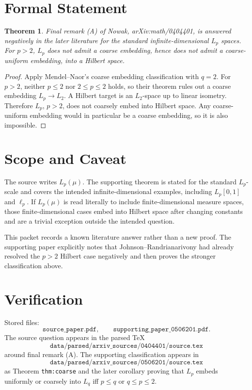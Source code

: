 \documentclass[11pt]{article}
\newtheorem*{theorem}{Theorem}
\begin{document}
\section*{Formal Statement}

\begin{theorem}
Final remark (A) of Nowak, arXiv:math/0404401, is answered negatively in the
later literature for the standard infinite-dimensional \(L_p\) spaces. For
\(p>2\), \(L_p\) does not admit a coarse embedding, hence does not admit a
coarse-uniform embedding, into a Hilbert space.
\end{theorem}

\begin{proof}
Apply Mendel--Naor's coarse embedding classification with \(q=2\). For
\(p>2\), neither \(p\le 2\) nor \(2\le p\le 2\) holds, so their theorem rules
out a coarse embedding \(L_p\to L_2\). A Hilbert target is an \(L_2\)-space up
to linear isometry. Therefore \(L_p\), \(p>2\), does not coarsely embed into
Hilbert space. Any coarse-uniform embedding would in particular be a coarse
embedding, so it is also impossible.
\end{proof}

\section*{Scope and Caveat}

The source writes \(L_p(\mu)\). The supporting theorem is stated for the
standard \(L_p\)-scale and covers the intended infinite-dimensional examples,
including \(L_p[0,1]\) and \(\ell_p\). If \(L_p(\mu)\) is read literally to
include finite-dimensional measure spaces, those finite-dimensional cases
embed into Hilbert space after changing constants and are a trivial exception
outside the intended question.

This packet records a known literature answer rather than a new proof. The
supporting paper explicitly notes that Johnson--Randrianarivony had already
resolved the \(p>2\) Hilbert case negatively and then proves the stronger
classification above.

\section*{Verification}

Stored files:
\[
\texttt{source\_paper.pdf},\qquad
\texttt{supporting\_paper\_0506201.pdf}.
\]
The source question appears in the parsed TeX
\[
\texttt{data/parsed/arxiv\_sources/0404401/source.tex}
\]
around final remark (A). The supporting classification appears in
\[
\texttt{data/parsed/arxiv\_sources/0506201/source.tex}
\]
as Theorem \texttt{thm:coarse} and the later corollary proving that \(L_p\)
embeds uniformly or coarsely into \(L_q\) iff \(p\le q\) or \(q\le p\le 2\).
\end{document}
